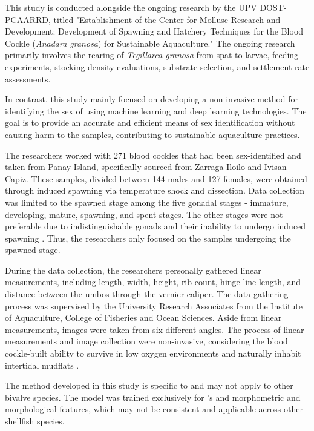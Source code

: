 This study is conducted alongside the ongoing research by the UPV DOST-PCAARRD, titled "Establishment of the Center for Mollusc Research and Development: Development of Spawning and Hatchery Techniques for the Blood Cockle (\textit{Anadara granosa}) for Sustainable Aquaculture." The ongoing research primarily involves the rearing of \textit{Tegillarca granosa} from spat to larvae, feeding experiments, stocking density evaluations, substrate selection, and settlement rate assessments.

In contrast, this study mainly focused on developing a non-invasive method for identifying the sex of \Tgranosa using machine learning and deep learning technologies. The goal is to provide an accurate and efficient means of sex identification without causing harm to the samples, contributing to sustainable aquaculture practices.

The researchers worked with 271  blood cockles that had been sex-identified and taken from Panay Island, specifically sourced from Zarraga Iloilo and Ivisan Capiz. These samples, divided between 144 males and 127 females, were obtained through induced spawning via temperature shock and dissection. Data collection was limited to the spawned stage among the five gonadal stages  - immature, developing, mature, spawning, and spent stages. The other stages were not preferable due to indistinguishable gonads and their inability to undergo induced spawning \cite{may2021}.  Thus, the researchers only focused on the samples undergoing the spawned stage. 

During the data collection,  the researchers personally gathered linear measurements, including length, width, height, rib count, hinge line length, and distance between the umbos through the vernier caliper. The data gathering process was supervised by the University Research Associates from the Institute of Aquaculture, College of Fisheries and Ocean Sciences. Aside from linear measurements, images were taken from six different angles. The process of linear measurements and image collection were non-invasive, considering the blood cockle-built ability to survive in low oxygen environments and naturally inhabit intertidal mudflats \cite{zhan2022}.

The method developed in this study is specific to \Tgranosa and may not apply to other bivalve species. The model was trained exclusively for \Tgranosa's and morphometric and morphological features, which may not be consistent and applicable across other shellfish species. 

